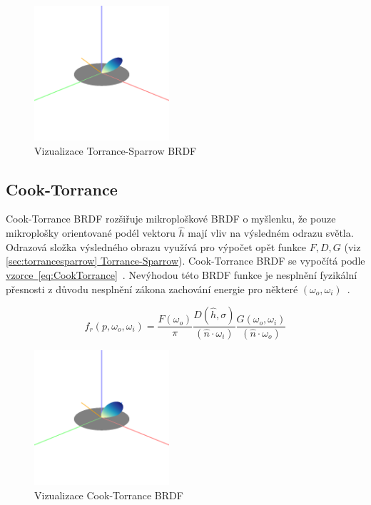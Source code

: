 \documentclass[czech,master]{diploma}
\newcommand{\uvec}[1]{\hat{#1}}
\newcommand{\point}{p}
\newcommand{\brdf}{f_r\left(\point,\omega_{o},\omega_{i}\right)}
\newcommand{\normVec}{\uvec{n}}
\newcommand{\inVec}{\omega_{i}}
\newcommand{\outVec}{\omega_{o}}
\newcommand{\halfVec}{\uvec{h}}
\newcommand{\rough}{\sigma}
\begin{document}
\begin{figure}[ht]%
  \centering\includegraphics[width=5cm]{Figures/visualizations/brdfTorranceSparrow.png}%
  \caption{Vizualizace Torrance-Sparrow BRDF}%
  \label{fig:torranceSparrowBRDFRender}%
\end{figure}

\subsection{Cook-Torrance}
Cook-Torrance BRDF rozšiřuje mikroploškové BRDF o myšlenku, že pouze mikroplošky orientované podél vektoru \(\halfVec\) mají vliv na výsledném odrazu světla. Odrazová složka výsledného obrazu využívá pro výpočet opět funkce \(F, D, G\) (viz \hyperref[sec:torrancesparrow]{\ref{sec:torrancesparrow} Torrance-Sparrow}). Cook-Torrance BRDF se vypočítá podle \hyperref[eq:CookTorrance]{vzorce~\ref{eq:CookTorrance}}~\cite{CookTorranceBRDF}. Nevýhodou této BRDF funkce je nesplnění fyzikální přesnosti z důvodu nesplnění zákona zachování energie pro některé \(\left(\outVec,\inVec\right)\)~\cite{BRDFOverview}.

\begin{equation} \label{eq:CookTorrance}
  \brdf  = \frac{F(\outVec)}{\pi} \frac{D(\halfVec,\rough)}{(\normVec\cdot\inVec)} \frac{G(\outVec,\inVec)}{(\normVec\cdot\outVec)}
\end{equation}


\begin{figure}[ht]%
  \centering\includegraphics[width=5cm]{Figures/visualizations/brdfCookTorrance.png}%
  \caption{Vizualizace Cook-Torrance BRDF}%
  \label{fig:cookTorranceBRDFRender}%
\end{figure}
\end{document}
